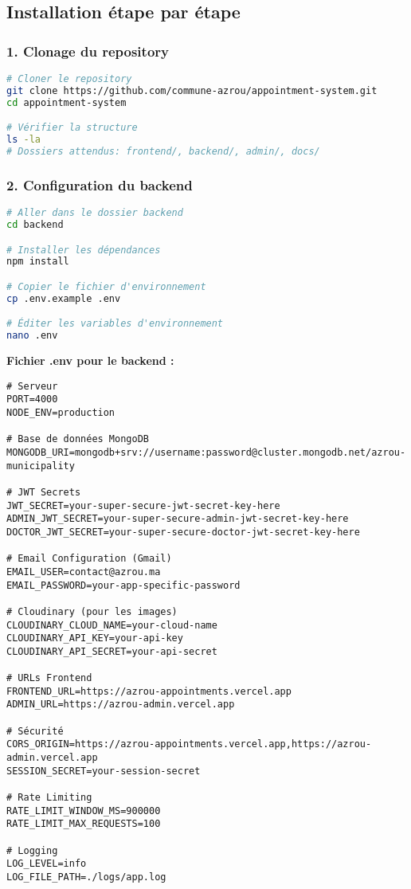 \subsection{Installation étape par étape}

\subsubsection{1. Clonage du repository}

\begin{lstlisting}[language=bash, caption=Clonage et configuration initiale]
# Cloner le repository
git clone https://github.com/commune-azrou/appointment-system.git
cd appointment-system

# Vérifier la structure
ls -la
# Dossiers attendus: frontend/, backend/, admin/, docs/
\end{lstlisting}

\subsubsection{2. Configuration du backend}

\begin{lstlisting}[language=bash, caption=Installation et configuration backend]
# Aller dans le dossier backend
cd backend

# Installer les dépendances
npm install

# Copier le fichier d'environnement
cp .env.example .env

# Éditer les variables d'environnement
nano .env
\end{lstlisting}

\textbf{Fichier .env pour le backend :}

\begin{lstlisting}[caption=Configuration backend .env]
# Serveur
PORT=4000
NODE_ENV=production

# Base de données MongoDB
MONGODB_URI=mongodb+srv://username:password@cluster.mongodb.net/azrou-municipality

# JWT Secrets
JWT_SECRET=your-super-secure-jwt-secret-key-here
ADMIN_JWT_SECRET=your-super-secure-admin-jwt-secret-key-here
DOCTOR_JWT_SECRET=your-super-secure-doctor-jwt-secret-key-here

# Email Configuration (Gmail)
EMAIL_USER=contact@azrou.ma
EMAIL_PASSWORD=your-app-specific-password

# Cloudinary (pour les images)
CLOUDINARY_CLOUD_NAME=your-cloud-name
CLOUDINARY_API_KEY=your-api-key
CLOUDINARY_API_SECRET=your-api-secret

# URLs Frontend
FRONTEND_URL=https://azrou-appointments.vercel.app
ADMIN_URL=https://azrou-admin.vercel.app

# Sécurité
CORS_ORIGIN=https://azrou-appointments.vercel.app,https://azrou-admin.vercel.app
SESSION_SECRET=your-session-secret

# Rate Limiting
RATE_LIMIT_WINDOW_MS=900000
RATE_LIMIT_MAX_REQUESTS=100

# Logging
LOG_LEVEL=info
LOG_FILE_PATH=./logs/app.log
\end{lstlisting}

